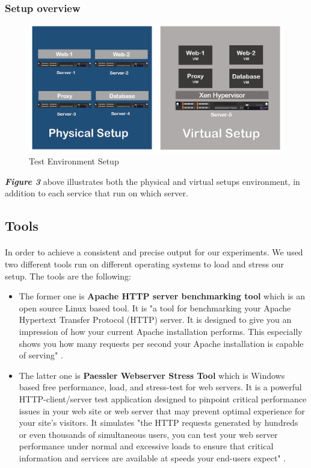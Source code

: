 \subsubsection{Setup overview}
\begin{figure}[H]
    \centering
    \includegraphics[width=14cm]{Pictures/setup.PNG}
    \caption{Test Environment Setup}
    \label{fig:QQ3}
\end{figure}

\textbf{\textit{Figure 3}} above illustrates both the physical and virtual setups environment, in addition to each service that run on which server.

\subsection{Tools}
\paragraph{}
In order to achieve a consistent and precise output for our experiments. We used two different tools run on different operating systems to load and stress our setup. The tools are the following: 

\begin{itemize}

\item The former one is \textbf{Apache HTTP server benchmarking tool} which is an open source Linux based tool. It is "a tool for benchmarking your Apache Hypertext Transfer Protocol (HTTP) server. It is designed to give you an impression of how your current Apache installation performs. This especially shows you how many requests per second your Apache installation is capable of serving" \cite{ab}. 

\item The latter one is \textbf{Paessler Webserver Stress Tool} which is Windows based free performance, load, and stress-test for web servers. It is a powerful HTTP-client/server test application designed to pinpoint critical performance issues in your web site or web server that may prevent optimal experience for your site's visitors. It  simulates "the HTTP requests generated by hundreds or even thousands of simultaneous users, you can test your web server performance under normal and excessive loads to ensure that critical information and services are available at speeds your end-users expect" \cite{paessler}.

\end{itemize}

